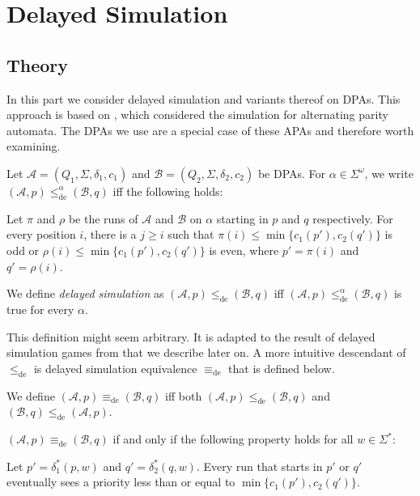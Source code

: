 
\chapter{Delayed Simulation}
\label{chap:fritzwilke}

\section{Theory}

In this part we consider delayed simulation and variants thereof on DPAs. This approach is based on \cite{FritzWilke06}, which considered the simulation for alternating parity automata. The DPAs we use are a special case of these APAs and therefore worth examining.

\begin{defn}
	Let $\mathcal{A} = (Q_1, \Sigma, \delta_1, c_1)$ and $\mathcal{B} = (Q_2, \Sigma, \delta_2, c_2)$ be DPAs. For $\alpha \in \Sigma^\omega$, we write $(\mathcal{A}, p) \leq_\text{de}^\alpha (\mathcal{B}, q)$ iff the following holds:
	
	Let $\pi$ and $\rho$ be the runs of $\mathcal{A}$ and $\mathcal{B}$ on $\alpha$ starting in $p$ and $q$ respectively. For every position $i$, there is a $j \geq i$ such that $\pi(i) \leq \min \{c_1(p'), c_2(q')\}$ is odd or $\rho(i) \leq \min \{c_1(p'), c_2(q')\}$ is even, where $p' = \pi(i)$ and $q' = \rho(i)$.
	
	We define \emph{delayed simulation} as $(\mathcal{A}, p) \leq_\text{de} (\mathcal{B}, q)$ iff $(\mathcal{A}, p) \leq_\text{de}^\alpha (\mathcal{B}, q)$ is true for every $\alpha$.
\end{defn}

This definition might seem arbitrary. It is adapted to the result of delayed simulation games from \cite{FritzWilke06} that we describe later on. A more intuitive descendant of $\leq_\text{de}$ is delayed simulation equivalence $\equiv_\text{de}$ that is defined below.

\begin{defn}
	We define $(\mathcal{A}, p) \equiv_\text{de} (\mathcal{B}, q)$ iff both $(\mathcal{A}, p) \leq_\text{de} (\mathcal{B}, q)$ and $(\mathcal{B}, q) \leq_\text{de} (\mathcal{A}, p)$.
\end{defn}

\begin{lem}
	\label{lem:fritzwilke:equivde_alternative}
	$(\mathcal{A}, p) \equiv_\text{de} (\mathcal{B}, q)$ if and only if the following property holds for all $w \in \Sigma^*$: 
	
	Let $p' = \delta_1^*(p, w)$ and $q' = \delta_2^*(q, w)$. Every run that starts in $p'$ or $q'$ eventually sees a priority less than or equal to $\min \{c_1(p'), c_2(q')\}$.
\end{lem}

